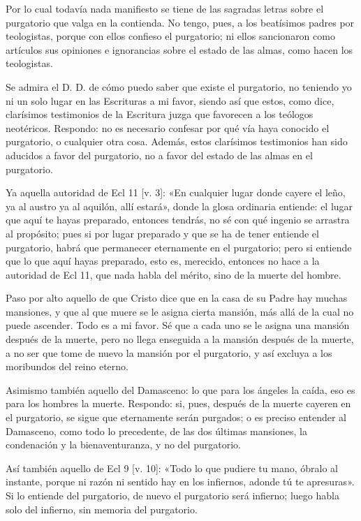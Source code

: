 Por lo cual todavía nada manifiesto se tiene de las sagradas letras sobre el purgatorio que valga en la contienda. No tengo, pues, a los beatísimos padres por teologistas, porque con ellos confieso el purgatorio; ni ellos sancionaron como artículos sus opiniones e ignorancias sobre el estado de las almas, como hacen los teologistas.

\marginpar{\small[331]} Se admira el D. D. de cómo puedo saber que existe el purgatorio, no teniendo yo ni un solo lugar en las Escrituras a mi favor, siendo así que estos, como dice, clarísimos testimonios de la Escritura juzga que favorecen a los teólogos neotéricos. Respondo: no es necesario confesar por qué vía haya conocido el purgatorio, o cualquier otra cosa. Además, estos clarísimos testimonios han sido aducidos a favor del purgatorio, no a favor del estado de las almas en el purgatorio.

Ya aquella autoridad de Ecl 11 [v. 3]: «En cualquier lugar donde cayere el leño, ya al austro ya al aquilón, allí estará», donde la glosa ordinaria entiende: el lugar que aquí te hayas preparado, entonces tendrás, no sé con qué ingenio se arrastra al propósito; pues si por lugar preparado y que se ha de tener entiende el purgatorio, habrá que permanecer eternamente en el purgatorio; pero si entiende que lo que aquí hayas preparado, esto es, merecido, entonces no hace a la autoridad de Ecl 11, que nada habla del mérito, sino de la muerte del hombre.

Paso por alto aquello de que Cristo dice que en la casa de su Padre hay muchas mansiones, y que al que muere se le asigna cierta mansión, más allá de la cual no puede ascender. Todo es a mi favor. Sé que a cada uno se le asigna una mansión después de la muerte, pero no llega enseguida a la mansión después de la muerte, a no ser que tome de nuevo la mansión por el purgatorio, y así excluya a los moribundos del reino eterno.

Asimismo también aquello del Damasceno: lo que para los ángeles la caída, eso es para los hombres la muerte. Respondo: si, pues, después de la muerte cayeren en el purgatorio, se sigue que eternamente serán purgados; o es preciso entender al Damasceno, como todo lo precedente, de las dos últimas mansiones, la condenación y la bienaventuranza, y no del purgatorio.

Así también aquello de Ecl 9 [v. 10]: «Todo lo que pudiere tu mano, óbralo al instante, porque ni razón ni sentido hay en los infiernos, adonde tú te apresuras». Si lo entiende del purgatorio, de nuevo el purgatorio será infierno; luego habla solo del infierno, sin memoria del purgatorio.

